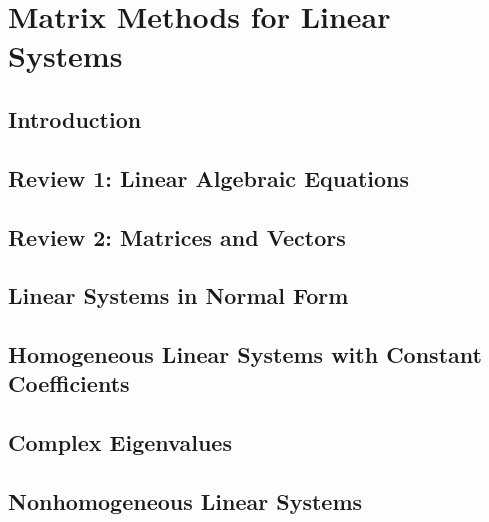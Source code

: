 \documentclass[../diffeq.tex]{subfiles}
\begin{document}
\chapter{Matrix Methods for Linear Systems}
\section{Introduction}
\section{Review 1: Linear Algebraic Equations}
\section{Review 2: Matrices and Vectors}
\section{Linear Systems in Normal Form}
\section{Homogeneous Linear Systems with Constant Coefficients}
\section{Complex Eigenvalues}
\section{Nonhomogeneous Linear Systems}
\end{document}
